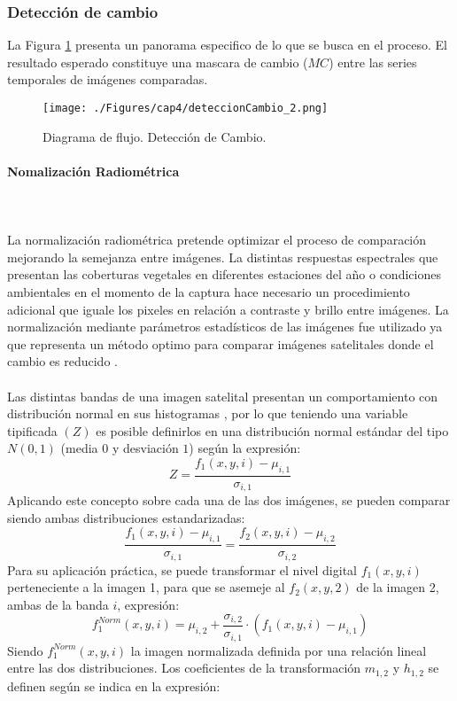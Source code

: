 \subsubsection{Detecci\'on de cambio}
La Figura \ref{fig:deteccionCambio} presenta un panorama especifico de lo que se busca en el proceso. El resultado esperado constituye una mascara de cambio ($ MC $) entre las series temporales de im\'agenes comparadas.
\begin{figure}[H]
	\centering
	\texttt{[image: ./Figures/cap4/deteccionCambio\_2.png]}
	\caption{Diagrama de flujo. Detecci\'on de Cambio.}
	\label{fig:deteccionCambio}
\end{figure}

\paragraph{Nomalizaci\'on Radiom\'etrica}\mbox{}\\\mbox{}\\
La normalizaci\'on radiom\'etrica pretende optimizar el proceso de comparaci\'on mejorando la semejanza entre im\'agenes. La distintas respuestas espectrales que presentan las coberturas vegetales en diferentes estaciones del a\~{n}o o condiciones ambientales en el momento de la captura hace necesario un procedimiento adicional que iguale los pixeles en relaci\'on a contraste y brillo entre im\'agenes. La normalizaci\'on mediante par\'ametros estad\'isticos de las im\'agenes fue utilizado ya que representa un m\'etodo optimo para comparar im\'agenes satelitales donde el cambio es reducido \cite{mateu1999comparacion}.\\~\\
Las distintas bandas de una imagen satelital presentan un comportamiento con distribuci\'on normal en sus histogramas \cite{martinez2013normalizacion}, por lo que teniendo una variable tipificada $(Z)$ es posible definirlos en una distribuci\'on normal est\'andar del tipo $ N(0,1) $ (media $ 0 $ y desviaci\'on $ 1 $) seg\'un la expresión:
	\begin{equation}
	Z=\dfrac{f_{1}(x,y,i)-\mu_{i,1}}{\sigma_{i,1}}
	\end{equation}
	Aplicando este concepto sobre cada una de las dos im\'agenes, se pueden comparar siendo ambas distribuciones estandarizadas:
	\begin{equation}
	\dfrac{f_{1}(x,y,i)-\mu_{i,1}}{\sigma_{i,1}}=\dfrac{f_{2}(x,y,i)-\mu_{i,2}}{\sigma_{i,2}}
	\end{equation}
	Para su aplicaci\'on pr\'actica, se puede transformar el nivel digital $ f_{1}(x,y,i) $ perteneciente a la imagen 1, para que se asemeje al $ f_{2}(x,y,2) $ de la imagen 2, ambas de la banda $ i $, expresi\'on:
	\begin{equation}
	f_{1}^{Norm}(x,y,i)=\mu_{i,2}+\dfrac{\sigma_{i,2}}{\sigma_{i,1}}\cdot(f_{1}(x,y,i)-\mu_{i,1})
	\end{equation}
	 Siendo $ f_{1}^{Norm}(x,y,i) $ la imagen normalizada definida por una relaci\'on lineal entre las dos distribuciones. Los coeficientes de la transformaci\'on $ m_{1,2} $ y $ h_{1,2} $ se definen seg\'un se indica en la expresi\'on:
	
